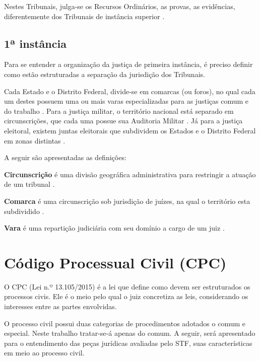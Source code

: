 Nestes Tribunais, julga-se os Recursos Ordinários, as provas, as evidências, diferentemente dos Tribunais de instância superior \cite{JUNIOR2012}.

\subsection{1ª instância}

Para se entender a organização da justiça de primeira instância, é preciso definir como estão estruturadas a separação da jurisdição dos Tribunais.

Cada Estado e o Distrito Federal, divide-se em comarcas (ou foros), no qual cada um destes possuem uma ou mais varas especializadas  para as justiças comum e do trabalho \cite{JUNIOR2012}. Para a justiça militar, o território nacional está separado em circunscrições, que cada uma possue sua Auditoria Militar \cite{BRASIL1992}. Já para a justiça eleitoral, existem juntas eleitorais que subdividem os Estados e o Distrito Federal em zonas distintas \cite{BRASIL1988}.

A seguir são apresentadas as definições:

\begin{description}
	\item \textbf{Circunscrição} é uma divisão geográfica administrativa para restringir a atuação de um tribunal \cite[p. 71]{GUIMARAES2012}.
	\item \textbf{Comarca} é uma circunscrição sob jurisdição de juízes, na qual o território esta subdividido \cite[p. 75]{GUIMARAES2012}.
    \item \textbf{Vara} é uma repartição judiciária com seu domínio a cargo de um juiz \cite[p. 259]{GUIMARAES2012}.
\end{description}


\section{Código Processual Civil (CPC)}

O CPC (Lei n.º 13.105/2015) é a lei que define como devem ser estruturados os processos civis. Ele é o meio pelo qual o juiz concretiza as leis, considerando os interesses entre as partes envolvidas.

O processo civil possui duas categorias de procedimentos adotados o comum e especial. Neste trabalho tratar-se-á apenas do comum. A seguir, será apresentado para o entendimento das peças jurídicas avaliadas pelo STF, suas características em meio ao processo civil.

